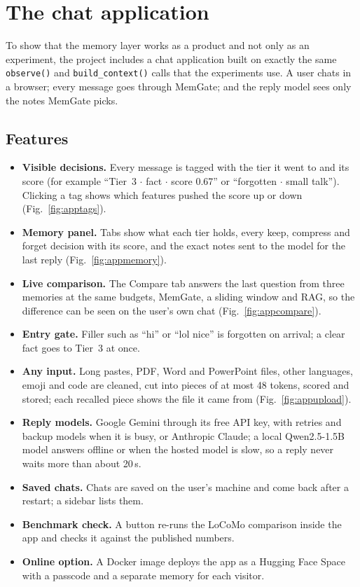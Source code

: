 \section{The chat application}
\label{sec:app}

To show that the memory layer works as a product and not only as an
experiment, the project includes a chat application built on exactly the
same \texttt{observe()} and \texttt{build\_context()} calls that the
experiments use. A user chats in a browser; every message goes through
MemGate; and the reply model sees only the notes MemGate picks.

\subsection{Features}
\begin{itemize}
\item \textbf{Visible decisions.} Every message is tagged with the tier it
  went to and its score (for example ``Tier~3 $\cdot$ fact $\cdot$ score
  0.67'' or ``forgotten $\cdot$ small talk''). Clicking a tag shows which
  features pushed the score up or down (Fig.~\ref{fig:apptags}).
\item \textbf{Memory panel.} Tabs show what each tier holds, every keep,
  compress and forget decision with its score, and the exact notes sent to the
  model for the last reply (Fig.~\ref{fig:appmemory}).
\item \textbf{Live comparison.} The Compare tab answers the last question
  from three memories at the same budgets, MemGate, a sliding window and RAG,
  so the difference can be seen on the user's own chat
  (Fig.~\ref{fig:appcompare}).
\item \textbf{Entry gate.} Filler such as ``hi'' or ``lol nice'' is
  forgotten on arrival; a clear fact goes to Tier~3 at once.
\item \textbf{Any input.} Long pastes, PDF, Word and PowerPoint files, other
  languages, emoji and code are cleaned, cut into pieces of at most 48 tokens,
  scored and stored; each recalled piece shows the file it came from
  (Fig.~\ref{fig:appupload}).
\item \textbf{Reply models.} Google Gemini through its free API key, with
  retries and backup models when it is busy, or Anthropic Claude; a local
  Qwen2.5-1.5B model answers offline or when the hosted model is slow, so a
  reply never waits more than about 20\,s.
\item \textbf{Saved chats.} Chats are saved on the user's machine and come
  back after a restart; a sidebar lists them.
\item \textbf{Benchmark check.} A button re-runs the LoCoMo comparison
  inside the app and checks it against the published numbers.
\item \textbf{Online option.} A Docker image deploys the app as a Hugging
  Face Space with a passcode and a separate memory for each visitor.
\end{itemize}

